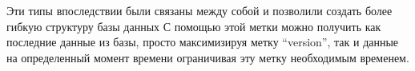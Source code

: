 \indent Эти типы впоследствии были связаны между собой и позволили создать более гибкую структуру базы данных
С помощью этой метки можно получить как последние данные из базы, просто максимизируя метку ``version'', так и данные на определенный момент времени ограничивая эту метку необходимым временем.